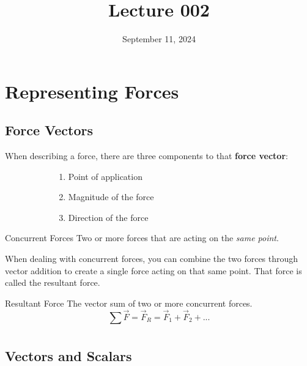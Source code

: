 \documentclass[12pt]{article}
\title{Lecture 002}
\date{September 11, 2024}
\begin{document}
\section{Representing Forces}
\label{sec:representingForces}

\subsection{Force Vectors}
\label{ssec:forceVectors}

When describing a force, there are three components to that \textbf{force vector}:

\begin{figure}[h]
  \begin{subfigure}[H]{0.6\textwidth}
    \begin{enumerate}
      \itemsep0em
      \item Point of application
      \item Magnitude of the force
      \item Direction of the force
    \end{enumerate}
  \end{subfigure}
  \begin{subfigure}[H]{0.3\textwidth}
    \centering
    
  \end{subfigure}
\end{figure}


\begin{definition}{Concurrent Forces}
  Two or more forces that are acting on the \textit{same point}.
\end{definition}

When dealing with concurrent forces, you can combine the two forces through vector addition
to create a single force acting on that same point. That force is called the resultant force.

\begin{definition}{Resultant Force}
  The vector sum of two or more concurrent forces.
  \begin{equation*}
    \sum_{}^{} \overrightarrow{F} = \overrightarrow{F}_R = \overrightarrow{F}_1 + \overrightarrow{F}_2 +...
  \end{equation*}
\end{definition}

\subsection{Vectors and Scalars}
\label{ssec:vectorsAndScalars}
\end{document}

